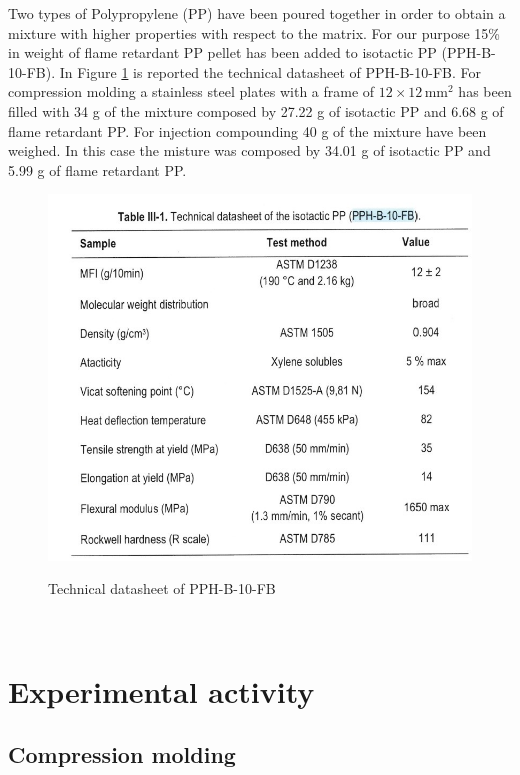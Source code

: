\documentclass[a4paper, 11pt]{article}
\begin{document}
Two types of Polypropylene (PP) have been poured together in order to obtain a mixture with higher properties with respect to the matrix. For our purpose 15\% in weight of flame retardant PP pellet has been added to isotactic PP (PPH-B-10-FB). In Figure \ref{fig:datasheet} is reported the technical datasheet of PPH-B-10-FB.
For compression molding a stainless steel plates with a frame of $12\times 12\, \text{mm}^2$ has been filled with 34 g of the mixture composed by 27.22 g of isotactic PP and 6.68 g of flame retardant PP. 
For injection compounding 40 g of the mixture have been weighed. In this case the misture was composed by 34.01 g of isotactic PP and 5.99 g of flame retardant PP.
\begin{figure}[h!]
	\centering
	{\includegraphics[scale=0.6]{datasheetPP}}
	\captionsetup{justification=centering}
	\caption{Technical datasheet of PPH-B-10-FB}
	\label{fig:datasheet}
\end{figure}\\

\section{Experimental activity}

\subsection{Compression molding}
\end{document}
